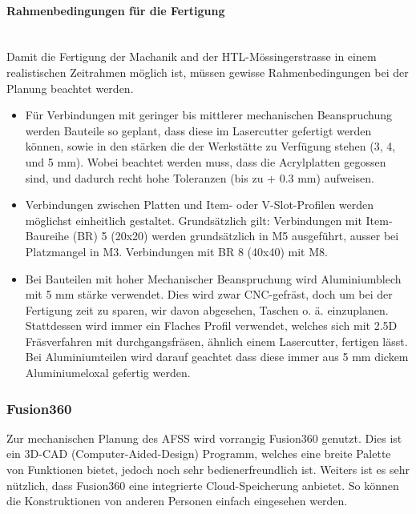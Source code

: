 \paragraph{Rahmenbedingungen für die Fertigung}\mbox{}\\
Damit die Fertigung der Machanik and der HTL-Mössingerstrasse in einem realistischen Zeitrahmen möglich ist, müssen gewisse Rahmenbedingungen bei der Planung beachtet werden.
\begin{itemize}
    \item Für Verbindungen mit geringer bis mittlerer mechanischen Beanspruchung werden Bauteile so geplant, dass diese im Lasercutter gefertigt werden können, sowie in den stärken die der Werkstätte zu Verfügung stehen (3, 4, und 5 mm). Wobei beachtet werden muss, dass die Acrylplatten gegossen sind, und dadurch recht hohe Toleranzen (bis zu + 0.3 mm) aufweisen.
    \item Verbindungen zwischen Platten und Item- oder V-Slot-Profilen werden möglichst einheitlich gestaltet. Grundsätzlich gilt: Verbindungen mit Item-Baureihe (BR) 5 (20x20) werden grundsätzlich in M5 ausgeführt, ausser bei Platzmangel in M3. Verbindungen mit BR 8 (40x40) mit M8. 
    \item Bei Bauteilen mit hoher Mechanischer Beanspruchung wird Aluminiumblech mit 5 mm stärke verwendet. Dies wird zwar CNC-gefräst, doch um bei der Fertigung zeit zu sparen, wir davon abgesehen, Taschen o. ä. einzuplanen. Stattdessen wird immer ein Flaches Profil verwendet, welches sich mit 2.5D Fräsverfahren mit durchgangsfräsen, ähnlich einem Lasercutter, fertigen lässt. Bei Aluminiumteilen wird darauf geachtet dass diese immer aus 5 mm dickem Aluminiumeloxal gefertig werden.
\end{itemize}

\subsubsection{Fusion360}
Zur mechanischen Planung des AFSS wird vorrangig Fusion360 genutzt. Dies ist ein 3D-CAD (Computer-Aided-Design) Programm, welches eine breite Palette von Funktionen bietet, jedoch noch sehr bedienerfreundlich ist. Weiters ist es sehr nützlich, dass Fusion360 eine integrierte Cloud-Speicherung anbietet. So können die Konstruktionen von anderen Personen einfach eingesehen werden. 

